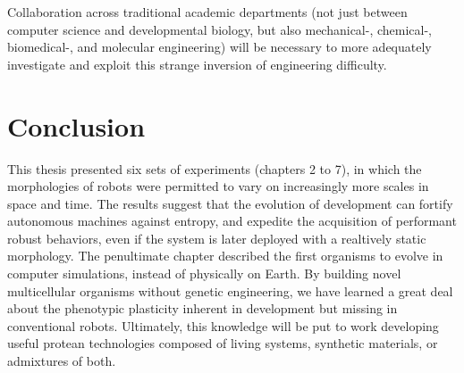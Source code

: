 Collaboration across traditional academic departments
(not just between computer science and developmental biology, but also mechanical-, chemical-, biomedical-, and molecular engineering)
will be necessary
to more adequately investigate and exploit this strange inversion of engineering difficulty.




\section{Conclusion}

This thesis presented six sets of experiments (chapters 2 to 7), in which the morphologies of robots were permitted to vary on increasingly more scales in space and time.
The results suggest that the evolution of development can 
fortify autonomous machines against entropy,
and
expedite the acquisition of performant robust behaviors,
even if the system is later deployed with a realtively static morphology.
The penultimate chapter described the first organisms to evolve in computer simulations, instead of physically on Earth.
By building novel multicellular organisms without genetic engineering, we have learned a great deal about the phenotypic plasticity inherent in development but missing in conventional robots.
Ultimately, this knowledge will be put to work developing useful protean technologies composed of living systems, synthetic materials, or admixtures of both.

